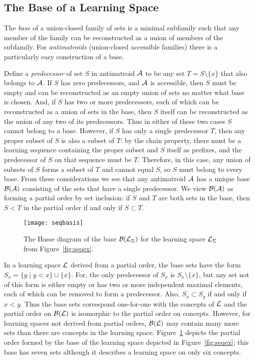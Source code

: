\documentclass[11pt]{llncs}
\begin{document}
{\subsection{The Base of a Learning Space}

The \emph{base} of a union-closed family of sets is a minimal subfamily such that any member of the family can be reconstructed as a union of members of the subfamily.
For \emph{antimatroids} (union-closed accessible families) there is a particularly easy construction of a base.

Define a \emph{predecessor} of set $S$ in antimatroid $\cal A$ to be any set $T=S\setminus\{x\}$ that also belongs to $\cal A$. If $S$ has zero predecessors, and $\cal A$ is accessible, then $S$ must be empty and can be reconstructed as an empty union of sets no matter what base is chosen.
And, if $S$ has two or more predecessors, each of which can be reconstructed as a union of sets in the base, then $S$ itself can be reconstructed as the union of any two of its predecessors.
Thus in either of these two cases $S$ cannot belong to a base.
However, if $S$ has only a single predecessor $T$, then any proper subset of $S$ is also a subset of $T$: by the chain property, there must be a learning sequence containing the proper subset and $S$ itself as prefixes, and the predecessor of $S$ on that sequence must be $T$. Therefore, in this case, any union of subsets of $S$ forms a subset of $T$ and cannot equal $S$, so $S$ must belong to every base.
From these considerations we see that any antimatroid $\cal A$ has a unique base ${\cal B}({\cal A})$ consisting of the sets that have a single predecessor. We view ${\cal B}({\cal A})$ as forming a partial order by set inclusion: if $S$ and $T$ are both sets in the base, then $S<T$ in the partial order if and only if $S\subset T$.

\begin{figure}[t]
\centering\texttt{[image: seqbasis]}
\caption{The Hasse diagram of the base ${\cal B}({\cal L}_\Sigma)$ for the learning space ${\cal L}_\Sigma$ from Figure~\ref{fig:seqex}.}
\label{fig:seqbasis}
\end{figure}

In a learning space $\cal L$ derived from a partial order, the base sets have the form $S_x=\{y\mid y<x\}\cup\{x\}$. For, the only predecessor of $S_x$ is $S_x\setminus\{x\}$, but any set not of this form is either empty or has two or more independent maximal elements, each of which can be removed to form a predecessor. Also, $S_x\subset S_y$ if and only if $x<y$. Thus the base sets correspond one-for-one with the concepts of $\cal L$ and the partial order on ${\cal B}({\cal L})$ is isomorphic to the partial order on concepts. However, for learning spaces not derived from partial orders, ${\cal B}({\cal L})$ may contain many more sets than there are concepts in the learning space.
Figure~\ref{fig:seqbasis} depicts the partial order formed by the base of the learning space depicted in Figure~\ref{fig:seqex}; this base has seven sets although it describes a learning space on only six concepts.

}
\end{document}
